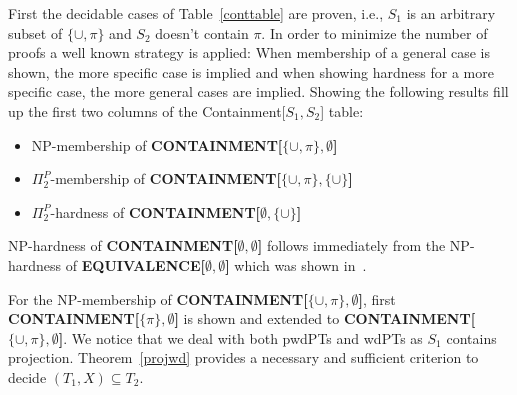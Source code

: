First the decidable cases of Table~\ref{conttable} are proven, i.e., $S_1$ is an arbitrary subset of
$\{\cup,\pi\}$ and $S_2$ doesn't contain $\pi$. 
In order to minimize the number of proofs a well known strategy is applied: When membership of a
general case is shown, the more specific case is implied and when showing
hardness for a more specific case, the more general cases are implied.  
Showing the following results fill up the first two columns of the
Containment[$S_1,S_2$] table:
\begin{itemize}
	\item NP-membership of \textbf{CONTAINMENT[$\{\cup,\pi\},\emptyset$]}
	\item $\Pi^P_2$-membership of \textbf{CONTAINMENT[$\{\cup,\pi\},\{\cup\}$]}
	\item $\Pi^P_2$-hardness of \textbf{CONTAINMENT[$\emptyset,\{\cup\}$]}
\end{itemize}
NP-hardness of \textbf{CONTAINMENT[$\emptyset,\emptyset$]} follows immediately
from the NP-hardness of \textbf{EQUIVALENCE[$\emptyset,\emptyset$]} which was shown
in~\cite{letelier2013static}.

For the NP-membership of \textbf{CONTAINMENT[$\{\cup,\pi \}, \emptyset$]}, 
first \textbf{CONTAINMENT[$\{\pi\} , \emptyset$]} is shown and extended to 
\textbf{CONTAINMENT[$\{\cup,\pi \}, \emptyset$]}. We notice that we deal with
both pwdPTs and wdPTs as $S_1$ contains projection. Theorem~\ref{projwd} provides a
necessary and sufficient criterion to decide $(T_1,X) \subseteq T_2$.

